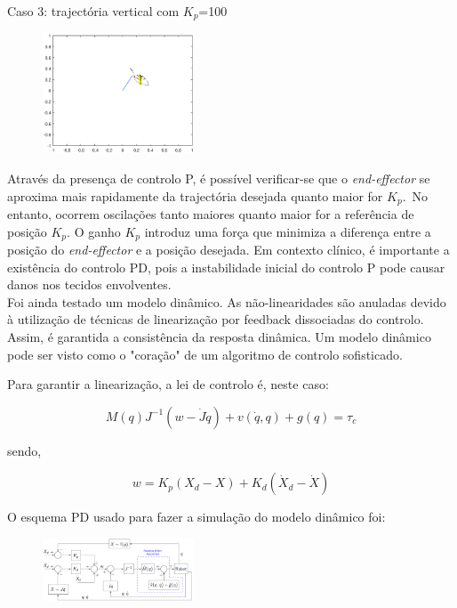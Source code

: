 \documentclass[a4paper,twocolumn,final,11pt]{article}
\begin{document}
Caso 3: trajectória vertical com $K_p$=100

\begin{figure}[H]
	\centering
	\includegraphics[width=0.4\textwidth]{7_vertical_p_ganho100.eps}
	\caption{}
  \label{}
\end{figure}


Através da presença de controlo P, é possível verificar-se que o \textit{end-effector} se aproxima mais rapidamente da trajectória desejada quanto maior for $K_p$.~No entanto, ocorrem oscilações tanto maiores quanto maior for a referência de posição $K_p$. O ganho $K_p$ introduz uma força que minimiza a diferença entre a posição do \textit{end-effector} e a posição desejada. 
Em contexto clínico, é importante a existência do controlo PD, pois a instabilidade inicial do controlo P pode causar danos nos tecidos envolventes.
\\

Foi ainda testado um modelo dinâmico. As não-linearidades são anuladas devido à utilização de técnicas de linearização por feedback dissociadas do controlo. Assim, é garantida a consistência da resposta dinâmica. 
Um modelo dinâmico pode ser visto como o "coração" de um algoritmo de controlo sofisticado.

Para garantir a linearização, a lei de controlo é, neste caso:

\begin{equation}
    M(q)J^{-1}(w-\dot{J}\dot{q}) + v(\dot{q},q) + g(q) = \tau_c
\end{equation}

sendo,

\begin{equation}
   w = K_p(X_d - X) + K_d(\dot{X}_d - \dot{X})
\end{equation}

O esquema PD usado para fazer a simulação do modelo dinâmico foi:

\begin{figure}[H]
	\centering
	\includegraphics[width=0.4\textwidth]{esquema_7_din.png}
	\caption{\cite{Cortesão}}
  \label{}
\end{figure}
\end{document}
